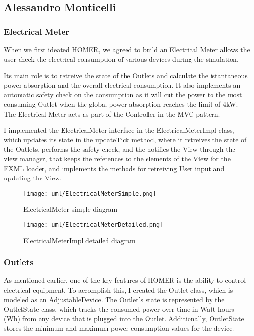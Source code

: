 \subsection{Alessandro Monticelli}
\subsubsection*{Electrical Meter}
When we first ideated HOMER, we agreed to build an Electrical Meter allows the user check the electrical consumption of various devices during the simulation.

Its main role is to retreive the state of the Outlets and calculate the istantaneous power absorption and the overall electrical consumption.
It also implements an automatic safety check on the consumption as it will cut the power to the most consuming Outlet when the global power absorption reaches the limit of 4kW.
The Electrical Meter acts as part of the Controller in the MVC pattern. 

I implemented the ElectricalMeter interface in the ElectricalMeterImpl class, which updates its state in the updateTick method, where it retreives the state of the Outlets, 
performs the safety check, and the notifies the View through the view manager, that keeps the references to the elements of the View for the FXML loader, 
and implements the methods for retreiving User input and updating the View.

\begin{figure}[H]
    \centering{}
    \texttt{[image: uml/ElectricalMeterSimple.png]}
    \caption{ElectricalMeter simple diagram}
    \label{monticelli:uml:simpleMeter}
\end{figure}

\begin{figure}[H]
    \centering{}
    \texttt{[image: uml/ElectricalMeterDetailed.png]}
    \caption{ElectricalMeterImpl detailed diagram}
    \label{monticelli:uml:detailedMeter}
\end{figure}

\subsubsection{Outlets}
As mentioned earlier, one of the key features of HOMER is the ability to control electrical equipment. \newline
To accomplish this, I created the Outlet class, which is modeled as an AdjustableDevice. \newline
The Outlet's state is represented by the OutletState class, which tracks the consumed power over time in Watt-hours (Wh) 
from any device that is plugged into the Outlet. Additionally, OutletState stores the minimum and maximum power consumption 
values for the device. \newline

